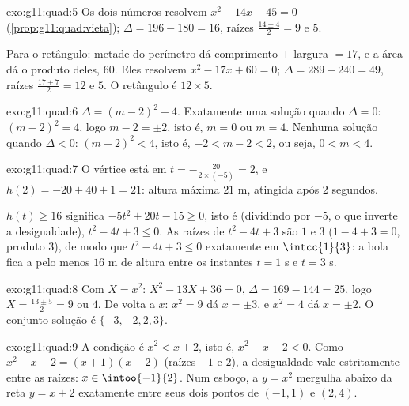 \begin{solution}{exo:g11:quad:5}
Os dois números resolvem $x^2 - 14x + 45 = 0$
(\cref{prop:g11:quad:vieta}); $\Delta = 196 - 180 = 16$, raízes
$\frac{14 \pm 4}{2} = 9$ e $5$.

Para o retângulo: metade do perímetro dá comprimento $+$ largura $= 17$,
e a área dá o produto deles, $60$. Eles resolvem $x^2 - 17x + 60 = 0$;
$\Delta = 289 - 240 = 49$, raízes $\frac{17 \pm 7}{2} = 12$ e $5$. O
retângulo é $12 \times 5$.
\end{solution}

\begin{solution}{exo:g11:quad:6}
$\Delta = (m-2)^2 - 4$. Exatamente uma solução quando $\Delta = 0$:
$(m-2)^2 = 4$, logo $m - 2 = \pm 2$, isto é, $m = 0$ ou $m = 4$. Nenhuma
solução quando $\Delta < 0$: $(m-2)^2 < 4$, isto é, $-2 < m - 2 < 2$, ou
seja, $0 < m < 4$.
\end{solution}

\begin{solution}{exo:g11:quad:7}
O vértice está em $t = -\frac{20}{2 \times (-5)} = 2$, e
$h(2) = -20 + 40 + 1 = 21$: altura máxima $21$ m, atingida após $2$
segundos.

$h(t) \geq 16$ significa $-5t^2 + 20t - 15 \geq 0$, isto é (dividindo
por $-5$, o que inverte a desigualdade), $t^2 - 4t + 3 \leq 0$. As
raízes de $t^2-4t+3$ são $1$ e $3$ ($1 - 4 + 3 = 0$, produto $3$), de
modo que $t^2 - 4t + 3 \leq 0$ exatamente em $\intcc{1}{3}$: a bola fica
a pelo menos $16$ m de altura entre os instantes $t = 1$ s e $t = 3$ s.
\end{solution}

\begin{solution}{exo:g11:quad:8}
Com $X = x^2$: $X^2 - 13X + 36 = 0$, $\Delta = 169 - 144 = 25$, logo
$X = \frac{13 \pm 5}{2} = 9$ ou $4$. De volta a $x$: $x^2 = 9$ dá
$x = \pm 3$, e $x^2 = 4$ dá $x = \pm 2$. O conjunto solução é
$\{-3, -2, 2, 3\}$.
\end{solution}

\begin{solution}{exo:g11:quad:9}
A condição é $x^2 < x + 2$, isto é, $x^2 - x - 2 < 0$. Como
$x^2 - x - 2 = (x+1)(x-2)$ (raízes $-1$ e $2$), a desigualdade vale
estritamente entre as raízes: $x \in \intoo{-1}{2}$. Num esboço, a
 $y = x^2$ mergulha abaixo da reta $y = x+2$ exatamente entre
seus dois pontos de  $(-1, 1)$ e $(2, 4)$.
\end{solution}

